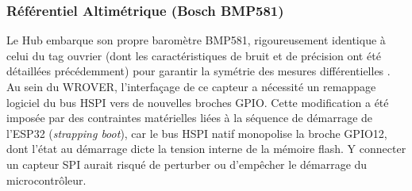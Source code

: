 
\newpage
\subsubsection{Référentiel Altimétrique (Bosch BMP581)}

Le Hub embarque son propre baromètre BMP581, rigoureusement identique à celui du tag ouvrier (dont les caractéristiques de bruit et de précision ont été détaillées précédemment) pour garantir la symétrie des mesures différentielles \cite{BMP581}. Au sein du WROVER, l'interfaçage de ce capteur a nécessité un remappage logiciel du bus HSPI vers de nouvelles broches GPIO. Cette modification a été imposée par des contraintes matérielles liées à la séquence de démarrage de l'ESP32 (\textit{strapping boot}), car le bus HSPI natif monopolise la broche GPIO12, dont l'état au démarrage dicte la tension interne de la mémoire flash. Y connecter un capteur SPI aurait risqué de perturber ou d'empêcher le démarrage du microcontrôleur.

